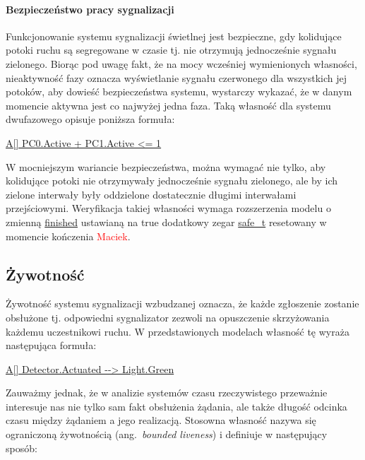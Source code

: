 \documentclass{pracamgr}
\newcommand{\ang}[1]{(ang.~\emph{#1})}
\newcommand{\todo}[1]{\textcolor{red}{#1}}
\theoremstyle{plain}
\begin{document}
\paragraph{Bezpieczeństwo pracy sygnalizacji}
Funkcjonowanie systemu sygnalizacji świetlnej jest bezpieczne, gdy
kolidujące potoki ruchu są segregowane w czasie tj. nie otrzymują
jednocześnie sygnału zielonego. Biorąc pod uwagę fakt, że na mocy
wcześniej wymienionych własności, nieaktywność fazy oznacza
wyświetlanie sygnału czerwonego dla wszystkich jej potoków, aby
dowieść bezpieczeństwa systemu, wystarczy wykazać, że w danym momencie
aktywna jest co najwyżej jedna faza. Taką własność dla systemu
dwufazowego opisuje poniższa formuła:
\begin{center}
  \url{A[] PC0.Active + PC1.Active <= 1}
\end{center}

W mocniejszym wariancie bezpieczeństwa, można wymagać nie tylko, aby
kolidujące potoki nie otrzymywały jednocześnie sygnału zielonego, ale
by ich zielone interwały były oddzielone dostatecznie długimi
interwałami przejściowymi. Weryfikacja takiej własności wymaga
rozszerzenia modelu o zmienną \url{finished} ustawianą na true dodatkowy zegar \url{safe_t} resetowany w
momencie kończenia \todo{Maciek}.

\subsection{Żywotność}
\label{s:properties:liveness}

Żywotność systemu sygnalizacji wzbudzanej oznacza, że każde zgłoszenie
zostanie obsłużone tj. odpowiedni sygnalizator zezwoli na opuszczenie
skrzyżowania każdemu uczestnikowi ruchu. W przedstawionych modelach
własność tę wyraża następująca formuła:
\begin{center}
\url{A[] Detector.Actuated --> Light.Green}
\end{center}
Zauważmy jednak, że w analizie systemów czasu rzeczywistego przeważnie
interesuje nas nie tylko sam fakt obsłużenia żądania, ale także
długość odcinka czasu między żądaniem a jego realizacją. Stosowna
własność nazywa się ograniczoną żywotnością \ang{bounded liveness}
i definiuje w następujący sposób:
\end{document}
